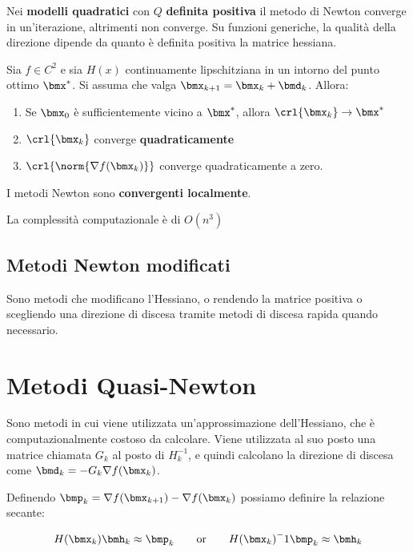 \documentclass[\main/main.tex]{subfiles}
\begin{document}
Nei \textbf{modelli quadratici} con \(Q\) \textbf{definita positiva} il metodo di Newton converge in un'iterazione, altrimenti non converge. Su funzioni generiche, la qualità della direzione dipende da quanto è definita positiva la matrice hessiana.

\begin{theorem}
    Sia \(f \in C^2\) e sia \(H(x)\) continuamente lipschitziana in un intorno del punto ottimo \(\bmx^*\). Si assuma che valga \(\bmx_{k+1} = \bmx_k + \bmd_k\). Allora:
    \begin{enumerate}
        \item Se \(\bmx_0\) è sufficientemente vicino a \(\bmx^*\), allora \(\crl{\bmx_k} \rightarrow \bmx^*\)
        \item \(\crl{\bmx_k}\) converge \textbf{quadraticamente}
        \item \(\crl{\norm{\nabla f(\bmx_k)}}\) converge quadraticamente a zero.
    \end{enumerate}
    I metodi Newton sono \textbf{convergenti localmente}.
\end{theorem}

La complessità computazionale è di \(O(n^3)\)

\subsection{Metodi Newton modificati}
Sono metodi che modificano l'Hessiano, o rendendo la matrice positiva o scegliendo una direzione di discesa tramite metodi di discesa rapida quando necessario.


\section{Metodi Quasi-Newton}
Sono metodi in cui viene utilizzata un'approssimazione dell'Hessiano, che è computazionalmente costoso da calcolare. Viene utilizzata al suo posto una matrice chiamata \(G_k\) al posto di \(H_k^{-1}\), e quindi calcolano la direzione di discesa come \(\bmd_k = -G_k \nabla f(\bmx_k)\).

\begin{definition}
    Definendo \(\bmp_k = \nabla f(\bmx_{k+1}) - \nabla f(\bmx_k)\) possiamo definire la relazione secante:

    \[
        H(\bmx_k)\bmh_k \approx \bmp_k \qquad \text{or} \qquad {H(\bmx_k)}^-1\bmp_k \approx \bmh_k
    \]
\end{definition}
\end{document}
